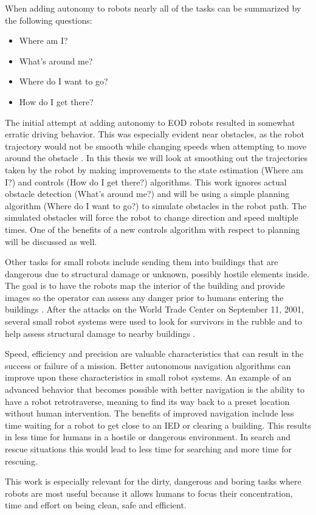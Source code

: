 When adding autonomy to robots nearly all of the tasks can be summarized by the following questions:
\begin{itemize}
\item Where am I?
\item What's around me?
\item Where do I want to go?
\item How do I get there?
\end{itemize}

The initial attempt at adding autonomy to EOD robots resulted in somewhat erratic driving behavior. This was especially evident near obstacles, as the robot trajectory would not be smooth while changing speeds when attempting to move around the obstacle \cite{Bruch00}. In this thesis we will look at smoothing out the trajectories taken by the robot by making improvements to the state estimation (Where am I?) and controls (How do I get there?) algorithms. This work ignores actual obstacle detection (What's around me?) and will be using a simple planning algorithm (Where do I want to go?) to simulate obstacles in the robot path. The simulated obstacles will force the robot to change direction and speed multiple times. One of the benefits of a new controls algorithm with respect to planning will be discussed as well.

Other tasks for small robots include sending them into buildings that are dangerous due to structural damage or unknown, possibly hostile elements inside. The goal is to have the robots map the interior of the building and provide images so the operator can assess any danger prior to humans entering the buildings \cite{CongressUGV06}. After the attacks on the World Trade Center on September 11, 2001, several small robot systems were used to look for survivors in the rubble and to help assess structural damage to nearby buildings \cite{Everett02}.

Speed, efficiency and precision are valuable characteristics that can result in the success or failure of a mission. Better autonomous navigation algorithms can improve upon these characteristics in small robot systems. An example of an advanced behavior that becomes possible with better navigation is the ability to have a robot retrotraverse, meaning to find its way back to a preset location without human intervention. The benefits of improved navigation include less time waiting for a robot to get close to an IED or clearing a building. This results in less time for humans in a hostile or dangerous environment. In search and rescue situations this would lead to less time for searching and more time for rescuing.

This work is especially relevant for the dirty, dangerous and boring tasks where robots are most useful because it allows humans to focus their concentration, time and effort on being clean, safe and efficient.

